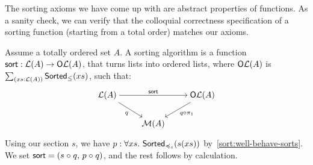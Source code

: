 The sorting axioms we have come up with are abstract properties of functions.
%
As a sanity check, we can verify that the colloquial correctness specification of a sorting function (starting from a
total order) matches our axioms.
%
\begin{proposition}
    \label{prop:sort-correctness}
    Assume a totally ordered set $A$.
    A sorting algorithm is a function $\operatorname{\mathsf{sort}} : \mathcal{L}(A) \to \mathsf{O}\mathcal{L}(A)$,
    that turns lists into ordered lists,
    where $\mathsf{O}\mathcal{L}(A)$ is $\dsum{xs : \LL(A)}{\term{Sorted}_{\leq}(xs)}$,
    such that:
    \[\begin{tikzcd}[ampersand replacement=\&,cramped]
            {\LL(A)} \&\& {\type{O}\LL(A)} \\
            \& {\MM(A)}
            \arrow["{\term{sort}}", from=1-1, to=1-3]
            \arrow["q"', from=1-1, to=2-2]
            \arrow["{q \comp \pi_1}", from=1-3, to=2-2]
        \end{tikzcd}\]
\end{proposition}
\begin{proofsketch}
    Using our section $s$,
    we have $p : \forall xs.\,\operatorname{\mathsf{Sorted}}_{\preccurlyeq_{s}}(s(xs))$ by~\cref{sort:well-behave-sorts}.
    We set $\operatorname{\mathsf{sort}} = (s \mathrel{\circ} q ,\,p \mathrel{\circ} q)$, and the rest follows by calculation.
\end{proofsketch}
